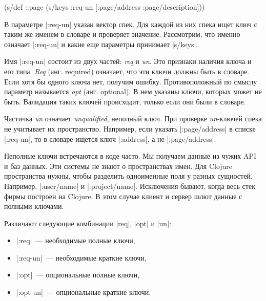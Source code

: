 \begin{english}
  \begin{clojure}
(s/def ::page
  (s/keys :req-un [:page/address
                   :page/description]))
  \end{clojure}
\end{english}

В параметре \spverb|:req-un| указан вектор спек. Для каждой из них спека ищет
ключ с таким же именем в словаре и проверяет значение. Рассмотрим, что именно
означает \spverb|:req-un| и какие еще параметры принимает \spverb|s/keys|.

Имя \spverb|:req-un| состоит из двух частей: \emph{req} и \emph{un}. Это
признаки наличия ключа и его типа. \emph{Req} (анг. required) означает, что эти
ключи должны быть в словаре. Если хотя бы одного ключа нет, получим
ошибку. Противоположный по смыслу параметр называется \emph{opt}
(анг. optional). В нем указаны ключи, которых может не быть. Валидация таких
ключей происходит, только если они были в словаре.

Частичка \emph{un} означает \emph{unqualified}, неполный ключ. При проверке
\emph{un}-ключей спека не учитывает их пространство. Например, если указать
\spverb|:page/address| в списке \spverb|:req-un|, то в словаре ищется ключ
\spverb|:address|, а не \spverb|:page/address|.

Неполные ключи встречаются в коде часто. Мы получаем данные из чужих API и баз
данных. Эти системы не знают о пространствах имен. Для Clojure пространства
нужны, чтобы разделить одноименные поля у разных сущностей. Например,
\spverb|:user/name| и \spverb|:project/name|. Исключения бывают, когда весь стек
фирмы построен на Clojure. В этом случае клиент и сервер шлют данные с полными
ключами.

Различают следующие комбинации \spverb|req|, \spverb|opt| и \spverb|un|:

\begin{itemize}

\item
  \spverb|:req|~--- необходимые полные ключи,

\item
  \spverb|:req-un|~--- необходимые краткие ключи,

\item
  \spverb|:opt|~--- опциональные полные ключи,

\item
  \spverb|:opt-un|~--- опциональные краткие ключи.

\end{itemize}

